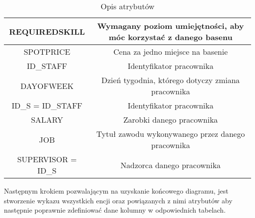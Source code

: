\documentclass[a4paper]{article}
\begin{document}
\begin{table}[htbp]
{\begin{tabular}{|c|c|}
REQUIREDSKILL          & Wymagany poziom umiejętności, aby móc korzystać z danego basenu                 \\ \hline
SPOTPRICE              & Cena za jedno miejsce na basenie                                                \\ \hline
ID\_STAFF              & Identyfikator pracownika                                                        \\ \hline
DAYOFWEEK              & Dzień tygodnia, którego dotyczy zmiana pracownika                               \\ \hline
ID\_S = ID\_STAFF      & Identyfikator pracownika                                                        \\ \hline
SALARY                 & Zarobki danego pracownika                                                       \\ \hline
JOB                    & Tytuł zawodu wykonywanego przez danego pracownika                               \\ \hline
SUPERVISOR = ID\_S     & Nadzorca danego pracownika                                                      \\ \hline
\end{tabular}
}
\caption{Opis atrybutów}
\end{table}

Następnym krokiem pozwalającym na uzyskanie końcowego diagramu, jest stworzenie wykazu wszystkich encji oraz powiązanych z nimi atrybutów aby następnie poprawnie zdefiniować dane kolumny w odpowiednich tabelach.

\newpage

\begin{table}[htbp]
\centering
{}
\caption{Wykaz encji i powiązanych z nimi atrybutów}
\end{table}
\end{document}

